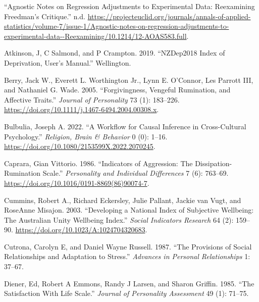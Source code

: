 \documentclass[
  letterpaper,
  DIV=11,
  numbers=noendperiod]{scrartcl}
\newlength{\cslhangindent}
\newlength{\cslentryspacingunit} %
\newenvironment{CSLReferences}[2] %
 {%
  \setlength{\parindent}{0pt}
  \ifodd #1
  \let\oldpar\par
  \def\par{\hangindent=\cslhangindent\oldpar}
  \fi
  \setlength{\parskip}{#2\cslentryspacingunit}
 }%
 {}
\begin{document}
\hypertarget{refs}{}
\begin{CSLReferences}{1}{0}
\leavevmode{}%
{``Agnostic Notes on Regression Adjustments to Experimental Data:
Reexamining Freedman{'}s Critique.''} n.d.
\url{https://projecteuclid.org/journals/annals-of-applied-statistics/volume-7/issue-1/Agnostic-notes-on-regression-adjustments-to-experimental-data--Reexamining/10.1214/12-AOAS583.full}.

\leavevmode{}%
Atkinson, J, C Salmond, and P Crampton. 2019. {``NZDep2018 Index of
Deprivation, User{'}s Manual.''} Wellington.

\leavevmode{}%
Berry, Jack W., Everett L. Worthington Jr., Lynn E. O'Connor, Les
Parrott III, and Nathaniel G. Wade. 2005. {``Forgivingness, Vengeful
Rumination, and Affective Traits.''} \emph{Journal of Personality} 73
(1): 183--226. \url{https://doi.org/10.1111/j.1467-6494.2004.00308.x}.

\leavevmode{}%
Bulbulia, Joseph A. 2022. {``A Workflow for Causal Inference in
Cross-Cultural Psychology.''} \emph{Religion, Brain \& Behavior} 0 (0):
1--16. \url{https://doi.org/10.1080/2153599X.2022.2070245}.

\leavevmode{}%
Caprara, Gian Vittorio. 1986. {``Indicators of Aggression: The
Dissipation-Rumination Scale.''} \emph{Personality and Individual
Differences} 7 (6): 763--69.
\url{https://doi.org/10.1016/0191-8869(86)90074-7}.

\leavevmode{}%
Cummins, Robert A., Richard Eckersley, Julie Pallant, Jackie van Vugt,
and RoseAnne Misajon. 2003. {``Developing a National Index of Subjective
Wellbeing: The Australian Unity Wellbeing Index.''} \emph{Social
Indicators Research} 64 (2): 159--90.
\url{https://doi.org/10.1023/A:1024704320683}.

\leavevmode{}%
Cutrona, Carolyn E, and Daniel Wayne Russell. 1987. {``The Provisions of
Social Relationships and Adaptation to Stress.''} \emph{Advances in
Personal Relationships} 1: 37--67.

\leavevmode{}%
Diener, Ed, Robert A Emmons, Randy J Larsen, and Sharon Griffin. 1985.
{``The Satisfaction With Life Scale.''} \emph{Journal of Personality
Assessment} 49 (1): 71--75.


\end{CSLReferences}
\end{document}
